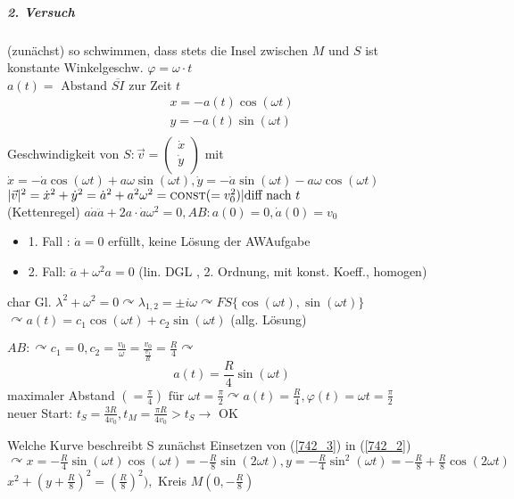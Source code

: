 \documentclass[a4paper]{scrartcl}
\begin{document}
\subparagraph{2. Versuch} (zunächst) so schwimmen, dass stets die Insel zwischen $M$ und $S$ ist\\
konstante Winkelgeschw. $\varphi  = \omega \cdot t$\\
$a(t) = \text{ Abstand } \overline{SI}$ zur Zeit $t$
\begin{equation}\label{742_2} \begin{array}{c} x= - a(t) \cos{(\omega t)} \\ y= -a(t) \sin{(\omega t)}\\ \end{array} \end{equation}
Geschwindigkeit von $S: \vec{v} = \begin{pmatrix} \dot{x} \\ \dot{y} \\ \end{pmatrix}$ mit $\dot{x} = -\dot{a} \cos{(\omega t)} + a \omega \sin{(\omega t)}, \dot{y} = - \dot{a} \sin{(\omega t)} - a \omega \cos{(\omega t)}$\\
$\lvert \vec{v} \rvert^2 = \dot{x}^2 + \dot{y}^2 = \dot{a}^2+ a^2 \omega^2 = \textsc{const} (= v_0^2) | \text{diff nach } t$\\
(Kettenregel) $a \dot{a} \ddot{a} + 2a \cdot \dot{a} \omega^2 = 0, AB: a(0) = 0, \dot{a}(0) = v_0$
\begin{itemize}
\item 1. Fall : $\dot{a} = 0$ erfüllt, keine Lösung der AWAufgabe
\item 2. Fall: $\ddot{a} + \omega^2 a =  0$ (lin. DGL , 2. Ordnung, mit konst. Koeff., homogen)
\end{itemize}
char Gl. $\lambda^2 + \omega^2 = 0 \curvearrowright \lambda_{1,2} = \pm i \omega \curvearrowright FS \{ \cos{(\omega t)}, \sin{(\omega t)} \}$\\
$\curvearrowright a(t) = c_1 \cos{(\omega t)} + c_2 \sin{(\omega t)}$ (allg. Lösung)

$AB: \curvearrowright c_1 = 0, c_2 = \frac{v_0}{\omega} = \frac{v_0}{\frac{v_1}{R}} = \frac{R}{4} \curvearrowright$ \begin{equation}\label{742_3} a(t)= \frac{R}{4} \sin{(\omega t)}\end{equation}
maximaler Abstand $(=\frac{\pi}{4}) \text{ für } \omega t = \frac{\pi}{2} \curvearrowright a(t) = \frac{R}{4}, \varphi(t)= \omega t = \frac{\pi}{2}$\\
neuer Start: $t_S = \frac{3R}{4v_0}, t_M = \frac{\pi R}{4 v_0} > t_S \rightarrow$ OK

Welche Kurve beschreibt S zunächst Einsetzen von (\ref{742_3}) in (\ref{742_2})\\
$\curvearrowright x = - \frac{R}{4} \sin{(\omega t)} \cos{(\omega t)} = - \frac{R}{8} \sin{(2 \omega t)}, y= - \frac{R}{4} \sin^2{(\omega t)} = - \frac{R}{8} + \frac{R}{8} \cos{(2 \omega t)}$\\
$x^2 + (y + \frac{R}{8})^2 = (\frac{R}{8})^2),$ Kreis $M(0,-\frac{R}{8})$
\end{document}
